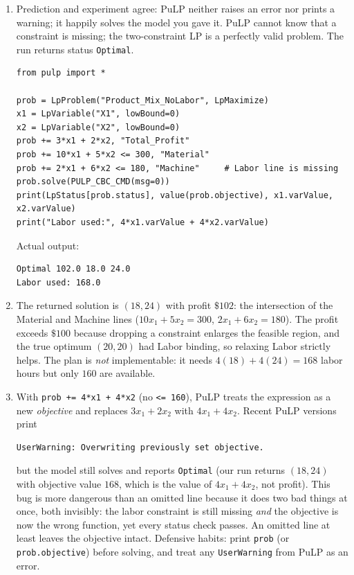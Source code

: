 \begin{enumerate}
\item Prediction and experiment agree: PuLP neither raises an error nor
prints a warning; it happily solves the model you gave it. PuLP cannot know
that a constraint is missing; the two-constraint LP is a perfectly valid
problem. The run returns status \texttt{Optimal}.

\begin{verbatim}
from pulp import *

prob = LpProblem("Product_Mix_NoLabor", LpMaximize)
x1 = LpVariable("X1", lowBound=0)
x2 = LpVariable("X2", lowBound=0)
prob += 3*x1 + 2*x2, "Total_Profit"
prob += 10*x1 + 5*x2 <= 300, "Material"
prob += 2*x1 + 6*x2 <= 180, "Machine"     # Labor line is missing
prob.solve(PULP_CBC_CMD(msg=0))
print(LpStatus[prob.status], value(prob.objective), x1.varValue, x2.varValue)
print("Labor used:", 4*x1.varValue + 4*x2.varValue)
\end{verbatim}

Actual output:
\begin{verbatim}
Optimal 102.0 18.0 24.0
Labor used: 168.0
\end{verbatim}

\item The returned solution is $(18, 24)$ with profit $\$102$: the
intersection of the Material and Machine lines
($10x_1 + 5x_2 = 300$, $2x_1 + 6x_2 = 180$). The profit exceeds $\$100$
because dropping a constraint enlarges the feasible region, and the true
optimum $(20,20)$ had Labor binding, so relaxing Labor strictly helps. The
plan is \emph{not} implementable: it needs $4(18) + 4(24) = 168$ labor hours
but only $160$ are available.

\item With \texttt{prob += 4*x1 + 4*x2} (no \texttt{<= 160}), PuLP treats the
expression as a new \emph{objective} and replaces $3x_1 + 2x_2$ with
$4x_1 + 4x_2$. Recent PuLP versions print
\begin{verbatim}
UserWarning: Overwriting previously set objective.
\end{verbatim}
but the model still solves and reports \texttt{Optimal} (our run returns
$(18, 24)$ with objective value $168$, which is the value of $4x_1 + 4x_2$,
not profit). This bug is more dangerous than an omitted line because it does
two bad things at once, both invisibly: the labor constraint is still missing
\emph{and} the objective is now the wrong function, yet every status check
passes. An omitted line at least leaves the objective intact. Defensive
habits: print \texttt{prob} (or \texttt{prob.objective}) before solving, and
treat any \texttt{UserWarning} from PuLP as an error.
\end{enumerate}

